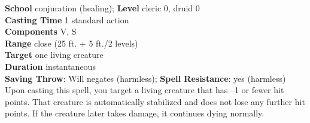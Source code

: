 \textbf{School }conjuration (healing); \textbf{Level }cleric 0, druid 0\\
\textbf{Casting Time }1 standard action\\
\textbf{Components }V, S\\
\textbf{Range }close (25 ft. + 5 ft./2 levels)\\
\textbf{Target} one living creature\\
\textbf{Duration }instantaneous\\
\textbf{Saving Throw}: Will negates (harmless); \textbf{Spell Resistance}: yes (harmless)\\
Upon casting this spell, you target a living creature that has --1 or fewer hit points. That creature is automatically stabilized and does not lose any further hit points. If the creature later takes damage, it continues dying normally.\\
